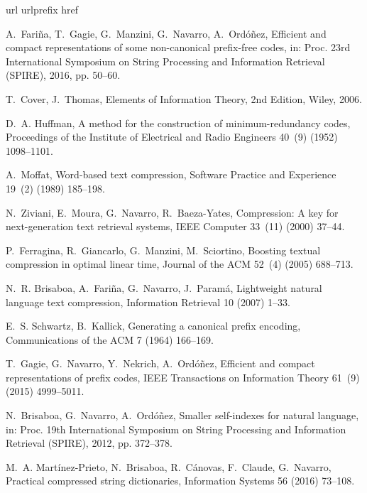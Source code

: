 \documentclass[preprint,12pt]{elsarticle}
\begin{document}
\begin{thebibliography}{10}
\expandafter\ifx\csname url\endcsname\relax
  \def\url#1{\texttt{#1}}\fi
\expandafter\ifx\csname urlprefix\endcsname\relax\def\urlprefix{URL }\fi
\expandafter\ifx\csname href\endcsname\relax
  \def\href#1#2{#2} \def\path#1{#1}\fi

A.~Fari{\~n}a, T.~Gagie, G.~Manzini, G.~Navarro, A.~{Ord{\'o\~n}ez}, Efficient
  and compact representations of some non-canonical prefix-free codes, in:
  Proc. 23rd International Symposium on String Processing and Information
  Retrieval (SPIRE), 2016, pp. 50--60.

T.~Cover, J.~Thomas, Elements of Information Theory, 2nd Edition, Wiley, 2006.

D.~A. Huffman, A method for the construction of minimum-redundancy codes,
  Proceedings of the Institute of Electrical and Radio Engineers 40~(9) (1952)
  1098--1101.

A.~Moffat, Word-based text compression, Software Practice and Experience 19~(2)
  (1989) 185--198.

N.~Ziviani, E.~Moura, G.~Navarro, R.~Baeza-Yates, Compression: A key for
  next-generation text retrieval systems, IEEE Computer 33~(11) (2000) 37--44.

P.~Ferragina, R.~Giancarlo, G.~Manzini, M.~Sciortino, Boosting textual
  compression in optimal linear time, Journal of the ACM 52~(4) (2005)
  688--713.

N.~R. Brisaboa, A.~Fari{\~n}a, G.~Navarro, J.~Param{\'a}, Lightweight natural
  language text compression, Information Retrieval 10 (2007) 1--33.

E.~S. Schwartz, B.~Kallick, Generating a canonical prefix encoding,
  Communications of the ACM 7 (1964) 166--169.

T.~Gagie, G.~Navarro, Y.~Nekrich, A.~{Ord{\'o\~n}ez}, Efficient and compact
  representations of prefix codes, IEEE Transactions on Information Theory
  61~(9) (2015) 4999--5011.

N.~Brisaboa, G.~Navarro, A.~Ord{\'o}{\~n}ez, Smaller self-indexes for natural
  language, in: Proc. 19th International Symposium on String Processing and
  Information Retrieval (SPIRE), 2012, pp. 372--378.

M.~A. Mart{\'i}nez-Prieto, N.~Brisaboa, R.~C{\'a}novas, F.~Claude, G.~Navarro,
  Practical compressed string dictionaries, Information Systems 56 (2016)
  73--108.


\end{thebibliography}
\end{document}
